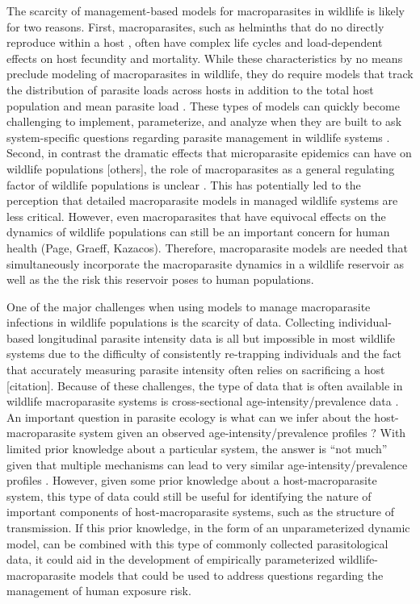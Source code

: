 \documentclass[11pt]{article}
\begin{document}
The scarcity of management-based models for macroparasites in wildlife is likely for two reasons. First, macroparasites, such as helminths that do no directly reproduce within a host \citep{AndersonandMay1979}, often have complex life cycles and load-dependent effects on host fecundity and mortality. While these characteristics by no means preclude modeling of macroparasites in wildlife, they do require models that track the distribution of parasite loads across hosts in addition to the total host population and mean parasite load \citep{AndersonandMay1978,Cornell2010}.  These types of models can quickly become challenging to implement, parameterize, and analyze when they are built to ask system-specific questions regarding parasite management in wildlife systems \citep{McCallum2017}.  Second, in contrast the dramatic effects that microparasite epidemics can have on wildlife populations \citep[e.g.][]{Webb2006,Hewson2014} [others], the role of macroparasites as a general regulating factor of wildlife populations is unclear \citep{Tompkins2002,Tompkins2011}. This has potentially led to the perception that detailed macroparasite models in managed wildlife systems are less critical. However, even macroparasites that have equivocal effects on the dynamics of wildlife populations can still be an important concern for human health (Page, Graeff, Kazacos). Therefore, macroparasite models are needed that simultaneously incorporate the macroparasite dynamics in a wildlife reservoir as well as the the risk this reservoir poses to human populations.  

One of the major challenges when using models to manage macroparasite infections in wildlife populations is the scarcity of data.  Collecting individual-based longitudinal parasite intensity data is all but impossible in most wildlife systems due to the difficulty of consistently re-trapping individuals and the fact that accurately measuring parasite intensity often relies on sacrificing a host [citation].  Because of these challenges, the type of data that is often available in wildlife macroparasite systems is cross-sectional age-intensity/prevalence data \citep[i.e. age-intensity/prevalence profiles][]{Pacala1988,Wilson2002}.  An important question in parasite ecology is what can we infer about the host-macroparasite system given an observed age-intensity/prevalence profiles \citep{Pacala1988,Wilson2002,Duerr2003}? With limited prior knowledge about a particular system, the answer is ``not much'' given that multiple mechanisms can lead to very similar age-intensity/prevalence profiles \citep{Wilson2002,Duerr2003}.  However, given some prior knowledge about a host-macroparasite system, this type of data could still be useful for identifying the nature of important components of host-macroparasite systems, such as the structure of transmission.  If this prior knowledge, in the form of an unparameterized dynamic model, can be combined with this type of commonly collected parasitological data, it could aid in the development of empirically parameterized wildlife-macroparasite models that could be used to address questions regarding the management of human exposure risk. 
\end{document}
